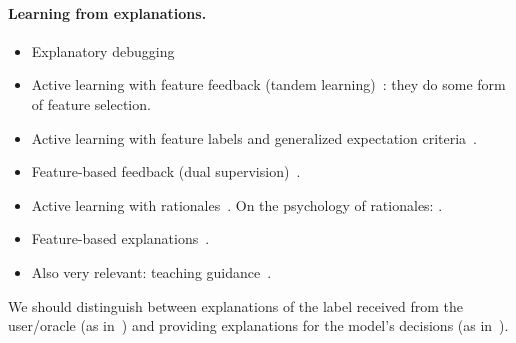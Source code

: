 \documentclass[a4paper,12pt]{article}
\begin{document}
\paragraph{Learning from explanations.}
\begin{itemize}

    \item
        Explanatory debugging~\cite{kulesza2015principles}

    \item
        Active learning with feature feedback (tandem
        learning)~\cite{raghavan2006active,raghavan2007interactive}: they do
        some form of feature selection.

    \item
        Active learning with feature labels and generalized expectation
        criteria~\cite{druck2008learning,druck2009active,settles2011closing}.

    \item
        Feature-based feedback (dual supervision)~\cite{attenberg2010unified}.

    \item
        Active learning with rationales~\cite{sharma2015active}. On the
        psychology of rationales: \cite{zaidan2008modeling}.

    \item
        Feature-based explanations~\cite{sharma2016towards}.

    \item
        Also very relevant: teaching guidance~\cite{cakmak2014eliciting}.

\end{itemize}
We should distinguish between explanations of the label received from the
user/oracle (as in~\cite{teso2017coactive,sharma2015active}) and providing
explanations for the model's decisions (as in~\cite{kulesza2015principles}).



\end{document}
